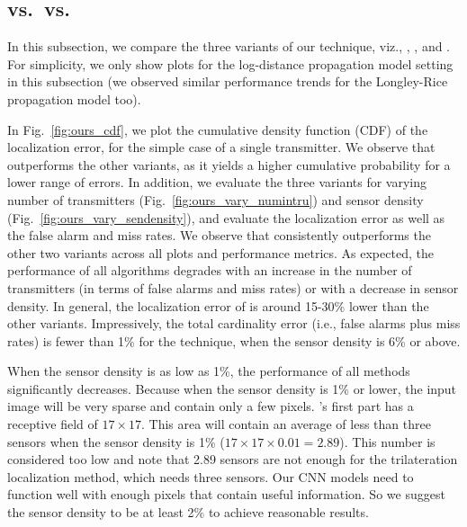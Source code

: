 \subsection{\our vs.\ \ouryolo vs.\ \ourpeak}

In this subsection, we compare the three variants of our technique, viz., \our, \ouryolo, and
\ourpeak. For simplicity, we only show plots for the log-distance propagation model setting in this 
subsection (we observed similar performance trends for the Longley-Rice propagation model too). 

In Fig.~\ref{fig:ours_cdf}, we plot  the cumulative density function (CDF) of the localization
error, for the simple case of a single transmitter.
We observe that \our outperforms the other variants, as it yields a higher cumulative probability for a lower range of errors.
In addition, we evaluate the three variants for varying number of transmitters (Fig.~\ref{fig:ours_vary_numintru}) and sensor density (Fig.~\ref{fig:ours_vary_sendensity}), and evaluate the localization error as well as the false alarm and miss rates. 
We observe that \our consistently outperforms the other two variants 
across all plots and performance metrics. As expected, the performance of all algorithms 
degrades with an increase in the number of transmitters (in terms of false alarms and miss rates) or with a decrease in sensor density. 
In general, the localization error of \our is around 15-30\% lower than the other variants.
Impressively, the total cardinality error (i.e., false alarms plus miss rates) is fewer than 1\% for the \our technique, when the sensor density is 6\% or above.

When the sensor density is as low as 1\%, the performance of all methods significantly decreases.
Because when the sensor density is 1\% or lower, the input image will be very sparse and contain only a few pixels.
\our's first part \imgimg has a receptive field of $17\times17$.
This area will contain an average of less than three sensors when the sensor density is 1\% ($17\times17\times0.01=2.89$).
This number is considered too low and note that 2.89 sensors are not enough for the trilateration localization method, which needs three sensors.
Our CNN models need to function well with enough pixels that contain useful information. 
So we suggest the sensor density to be at least 2\% to achieve reasonable results.


